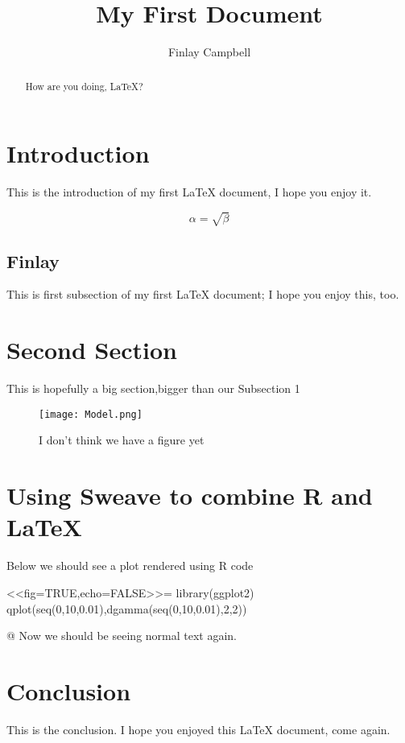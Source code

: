\documentclass{article}
\begin{document}
\title{My First Document}
\author{Finlay Campbell}

\maketitle

\begin{abstract}
	How are you doing, LaTeX?
\end{abstract}

\section{Introduction}
	This is the introduction of my first LaTeX document, I hope you enjoy it.
	
\begin{equation}
	\label{This is an equation}	
	\alpha = \sqrt{ \beta }
\end{equation}
	
\subsection{Finlay}
	This is first subsection of my first LaTeX document; I hope you enjoy this, too.

\section{Second Section}
	This is hopefully a big section,\newline bigger than our Subsection 1

\begin{figure}[!ht]
	\centering
	\texttt{[image: Model.png]}
	\caption{I don't think we have a figure yet}
	\label{Our Figure}
\end{figure}

\section{Using Sweave to combine R and LaTeX}
	Below we should see a plot rendered using R code

<<fig=TRUE,echo=FALSE>>=
	library(ggplot2)
	qplot(seq(0,10,0.01),dgamma(seq(0,10,0.01),2,2))

@
	Now we should be seeing normal text again. 


\section{Conclusion}
	This is the conclusion. 
	I hope you enjoyed this LaTeX document, come again. 
\end{document}
